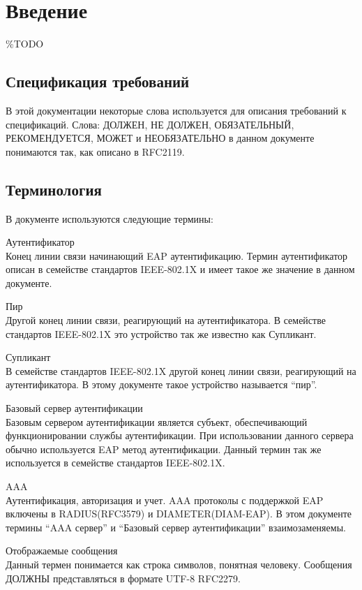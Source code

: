 \section{Введение}

\%TODO 

\subsection{Спецификация требований}

В этой документации некоторые слова используется для описания требований к спецификаций. Слова: ДОЛЖЕН, НЕ ДОЛЖЕН, ОБЯЗАТЕЛЬНЫЙ, РЕКОМЕНДУЕТСЯ, МОЖЕТ и НЕОБЯЗАТЕЛЬНО в данном документе понимаются так, как описано в RFC2119.

\subsection{Терминология}

В документе используются следующие термины:

Аутентификатор \\ Конец линии связи начинающий EAP аутентификацию. Термин аутентификатор описан в семействе стандартов IEEE-802.1X и имеет такое же значение в данном документе.

Пир \\ Другой конец линии связи, реагирующий на аутентификатора. В семействе стандартов IEEE-802.1X это устройство так же известно как Супликант.

Супликант \\  В семействе стандартов IEEE-802.1X другой конец линии связи, реагирующий на аутентификатора. В этому документе такое устройство называется ``пир''.

Базовый сервер аутентификации \\ Базовым сервером аутентификации является субъект, обеспечивающий функционировании службы аутентификации. При использовании данного сервера обычно используется EAP метод аутентификации. Данный термин так же используется в семействе стандартов IEEE-802.1X.

AAA \\ Аутентификация, авторизация и учет. AAA протоколы с поддержкой EAP включены в RADIUS(RFC3579) и DIAMETER(DIAM-EAP). В этом документе термины ``AAA сервер'' и ``Базовый сервер аутентификации'' взаимозаменяемы.

Отображаемые сообщения \\ Данный термен понимается как строка символов, понятная человеку. Сообщения ДОЛЖНЫ представляться в формате UTF-8 RFC2279.

